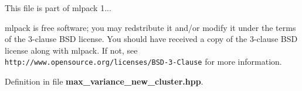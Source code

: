 This file is part of mlpack 1...

mlpack is free software; you may redstribute it and/or modify it under the terms of the 3-\/clause B\-S\-D license. You should have received a copy of the 3-\/clause B\-S\-D license along with mlpack. If not, see {\tt http\-://www.\-opensource.\-org/licenses/\-B\-S\-D-\/3-\/\-Clause} for more information. 

Definition in file {\bf max\-\_\-variance\-\_\-new\-\_\-cluster.\-hpp}.

